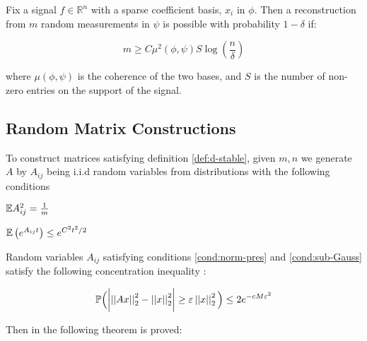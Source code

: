 \begin{theorem} 
Fix a signal \(f\in \mathbb{R}^n\) with a sparse coefficient basis, \(x_{i}\) in \(\phi\). Then a reconstruction from \(m\) random measurements in \(\psi\) is possible with probability \(1 - \delta\) if: 

\begin{equation}
m \geq C \mu^2(\phi, \psi) S \log\left(\frac{n}{\delta}\right)
\end{equation}
\label{minsamples}

where \( \mu(\phi, \psi)\) is the coherence of the two bases, and \(S\) is the number of non-zero entries on the support of the signal.
\end{theorem}

\subsection{Random Matrix Constructions} \label{sec:mtx-contruction}

To construct matrices satisfying definition \ref{def:d-stable}, given \(m, n\) we generate \(A\) by \(A_{ij}\) being i.i.d random variables from distributions with the following conditions \cite{davenport2010signal}

\begin{condition}
\({\mathbb{E}} A_{ij}^2 = \frac{1}{m}\)
\label{cond:norm-pres}
\end{condition}

\begin{condition}
\({\mathbb{E}}\left( e^{A_{ij}t} \right) \leq e^{C^2 t^2 /2}\)
\label{cond:sub-Gauss}
\end{condition}

Random variables \(A_{ij}\) satisfying conditions \eqref{cond:norm-pres} and \eqref{cond:sub-Gauss} satisfy the following concentration inequality \cite{baraniuk2008simple}:

\begin{lemma}
\begin{equation}
{\mathbb{P}}\Big( \biggl\lvert \left|\left|Ax\right|\right|_2^2 - \left|\left|x\right|\right|_2^2 \biggr\rvert\geq \varepsilon  \left|\left|x\right|\right|_2^2 \Big) \leq 2e^{-cM\varepsilon^2}
\label{cond:sub-Gauss concetration}
\end{equation} 
\end{lemma}

Then in \cite{baraniuk2008simple} the following theorem is proved:

